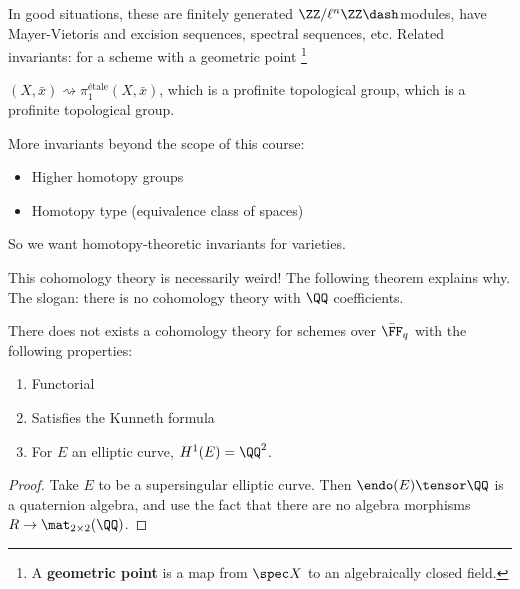 In good situations, these are finitely generated
\(\ZZ/\ell^n\ZZ\dash\)modules, have Mayer-Vietoris and excision
sequences, spectral sequences, etc. Related invariants: for a scheme
with a geometric point \footnote{A \textbf{geometric point} is a map
  from \(\spec X\) to an algebraically closed field.}

\((X, \bar x) \rightsquigarrow \pi_1^{\text{étale}}(X, \bar x)\), which
is a profinite topological group, which is a profinite topological
group.

\begin{remark}

More invariants beyond the scope of this course:

\begin{itemize}
\tightlist
\item
  Higher homotopy groups
\item
  Homotopy type (equivalence class of spaces)
\end{itemize}

So we want homotopy-theoretic invariants for varieties.

\end{remark}

\begin{remark}

This cohomology theory is necessarily weird! The following theorem
explains why. The slogan: there is no cohomology theory with \(\QQ\)
coefficients.

\end{remark}

\begin{theorem}[Serre]

There does not exists a cohomology theory for schemes over
\(\bar{\FF}_q\) with the following properties:

\begin{enumerate}
\def\labelenumi{\arabic{enumi}.}
\tightlist
\item
  Functorial
\item
  Satisfies the Kunneth formula
\item
  For \(E\) an elliptic curve, \(H^1(E) = \QQ^2\).
\end{enumerate}

\end{theorem}

\begin{proof}

Take \(E\) to be a supersingular elliptic curve. Then
\(\endo(E) \tensor \QQ\) is a quaternion algebra, and use the fact that
there are no algebra morphisms \(R\to \mat_{2\times 2}(\QQ)\).

\end{proof}

